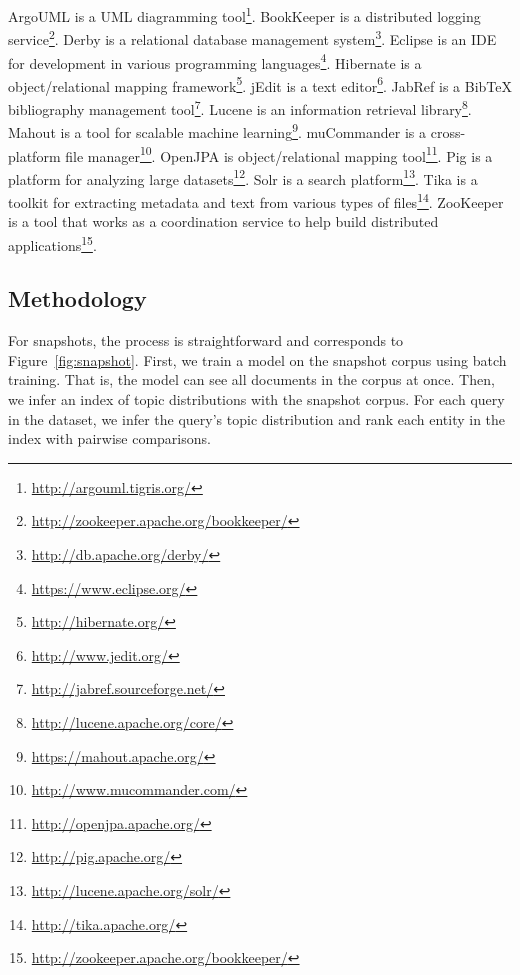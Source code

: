 ArgoUML is a UML diagramming tool\footnote{\url{http://argouml.tigris.org/}}.
BookKeeper is a distributed logging service\footnote{\url{http://zookeeper.apache.org/bookkeeper/}}.
Derby is a relational database management system\footnote{\url{http://db.apache.org/derby/}}.
Eclipse is an IDE for development in various programming languages\footnote{\url{https://www.eclipse.org/}}.
Hibernate is a object/relational mapping framework\footnote{\url{http://hibernate.org/}}.
jEdit is a text editor\footnote{\url{http://www.jedit.org/}}.
JabRef is a BibTeX bibliography management tool\footnote{\url{http://jabref.sourceforge.net/}}.
Lucene is an information retrieval library\footnote{\url{http://lucene.apache.org/core/}}.
Mahout is a tool for scalable machine learning\footnote{\url{https://mahout.apache.org/}}.
muCommander is a cross-platform file manager\footnote{\url{http://www.mucommander.com/}}.
OpenJPA is object/relational mapping tool\footnote{\url{http://openjpa.apache.org/}}.
Pig is a platform for analyzing large datasets\footnote{\url{http://pig.apache.org/}}.
Solr is a search platform\footnote{\url{http://lucene.apache.org/solr/}}.
Tika is a toolkit for extracting metadata and text from various types of files\footnote{\url{http://tika.apache.org/}}.
ZooKeeper is a tool that works as a coordination service to help build distributed applications\footnote{\url{http://zookeeper.apache.org/bookkeeper/}}.



\subsection{Methodology}
\label{sec:methodology}

For snapshots, the process is straightforward and corresponds to
Figure~\ref{fig:snapshot}.  First, we train a model on the snapshot corpus using
batch training.  That is, the model can see all documents in the corpus at once.
Then, we infer an index of topic distributions with the snapshot corpus.  For
each query in the dataset, we infer the query's topic distribution and rank each
entity in the index with pairwise comparisons.

